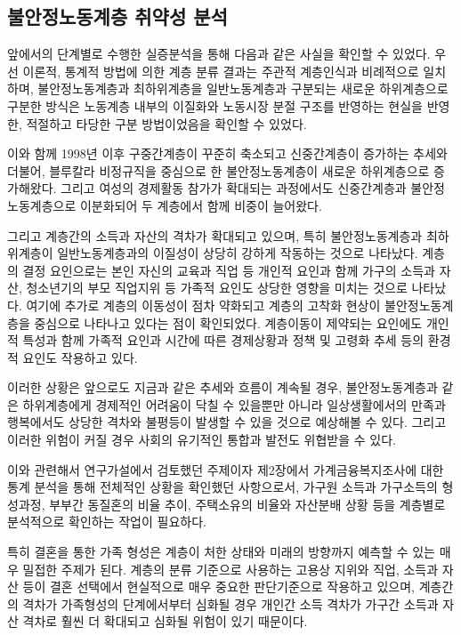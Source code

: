 \documentclass[
  letterpaper,
  DIV=11,
  numbers=noendperiod]{scrartcl}
\begin{document}
\newpage{}

\subsection{불안정노동계층 취약성
분석}\label{uxbd88uxc548uxc815uxb178uxb3d9uxacc4uxce35-uxcde8uxc57duxc131-uxbd84uxc11d}

앞에서의 단계별로 수행한 실증분석을 통해 다음과 같은 사실을 확인할 수
있었다. 우선 이론적, 통계적 방법에 의한 계층 분류 결과는 주관적
계층인식과 비례적으로 일치하며, 불안정노동계층과 최하위계층을
일반노동계층과 구분되는 새로운 하위계층으로 구분한 방식은 노동계층
내부의 이질화와 노동시장 분절 구조를 반영하는 현실을 반영한, 적절하고
타당한 구분 방법이었음을 확인할 수 있었다.

이와 함께 1998년 이후 구중간계층이 꾸준히 축소되고 신중간계층이 증가하는
추세와 더불어, 블루칼라 비정규직을 중심으로 한 불안정노동계층이 새로운
하위계층으로 증가해왔다. 그리고 여성의 경제활동 참가가 확대되는
과정에서도 신중간계층과 불안정노동계층으로 이분화되어 두 계층에서 함께
비중이 늘어왔다.

그리고 계층간의 소득과 자산의 격차가 확대되고 있으며, 특히
불안정노동계층과 최하위계층이 일반노동계층과의 이질성이 상당히 강하게
작동하는 것으로 나타났다. 계층의 결정 요인으로는 본인 자신의 교육과 직업
등 개인적 요인과 함께 가구의 소득과 자산, 청소년기의 부모 직업지위 등
가족적 요인도 상당한 영향을 미치는 것으로 나타났다. 여기에 추가로 계층의
이동성이 점차 약화되고 계층의 고착화 현상이 불안정노동계층을 중심으로
나타나고 있다는 점이 확인되었다. 계층이동이 제약되는 요인에도 개인적
특성과 함께 가족적 요인과 시간에 따른 경제상황과 정책 및 고령화 추세
등의 환경적 요인도 작용하고 있다.

이러한 상황은 앞으로도 지금과 같은 추세와 흐름이 계속될 경우,
불안정노동계층과 같은 하위계층에게 경제적인 어려움이 닥칠 수 있을뿐만
아니라 일상생활에서의 만족과 행복에서도 상당한 격차와 불평등이 발생할 수
있을 것으로 예상해볼 수 있다. 그리고 이러한 위험이 커질 경우 사회의
유기적인 통합과 발전도 위협받을 수 있다.

이와 관련해서 연구가설에서 검토했던 주제이자 제2장에서
가계금융복지조사에 대한 통계 분석을 통해 전체적인 상황을 확인했던
사항으로서, 가구원 소득과 가구소득의 형성과정, 부부간 동질혼의 비율
추이, 주택소유의 비율와 자산분배 상황 등을 계층별로 분석적으로 확인하는
작업이 필요하다.

특히 결혼을 통한 가족 형성은 계층이 처한 상태와 미래의 방향까지 예측할
수 있는 매우 밀접한 주제가 된다. 계층의 분류 기준으로 사용하는 고용상
지위와 직업, 소득과 자산 등이 결혼 선택에서 현실적으로 매우 중요한
판단기준으로 작용하고 있으며, 계층간의 격차가 가족형성의 단계에서부터
심화될 경우 개인간 소득 격차가 가구간 소득과 자산 격차로 훨씬 더
확대되고 심화될 위험이 있기 때문이다.
\end{document}
